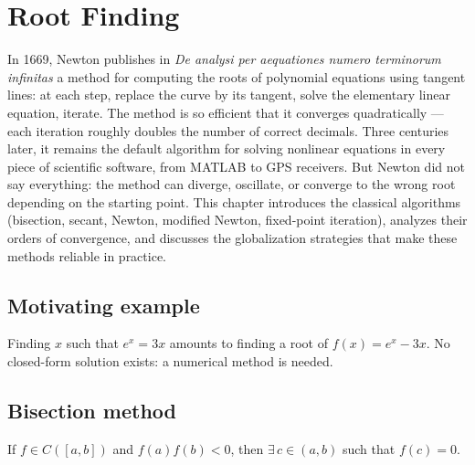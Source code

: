 \chapter{Root Finding}
\label{ch:roots}

In 1669, Newton publishes in \emph{De analysi per aequationes numero terminorum infinitas} a method for computing the roots of polynomial equations using tangent lines: at each step, replace the curve by its tangent, solve the elementary linear equation, iterate. The method is so efficient that it converges quadratically --- each iteration roughly doubles the number of correct decimals. Three centuries later, it remains the default algorithm for solving nonlinear equations in every piece of scientific software, from MATLAB to GPS receivers. But Newton did not say everything: the method can diverge, oscillate, or converge to the wrong root depending on the starting point. This chapter introduces the classical algorithms (bisection, secant, Newton, modified Newton, fixed-point iteration), analyzes their orders of convergence, and discusses the globalization strategies that make these methods reliable in practice.

\section{Motivating example}
Finding $x$ such that $e^x = 3x$ amounts to finding a root of $f(x)=e^x-3x$. No closed-form solution exists: a numerical method is needed.

\section{Bisection method}

\begin{theorem}
If $f\in C([a,b])$ and $f(a)f(b)<0$, then $\exists\,c\in(a,b)$ such that $f(c)=0$.
\end{theorem}

\begin{algorithm}[H]
\caption{Bisection}\label{alg:bisection}
\end{algorithm}

